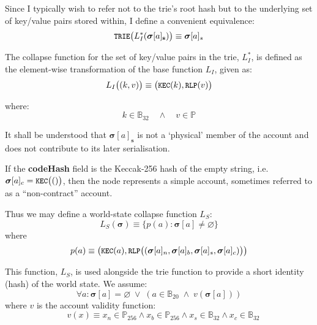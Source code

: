 \documentclass[9pt,oneside]{amsart}
\begin{document}
\begin{multicols}{2}
Since I typically wish to refer not to the trie's root hash but to the underlying set of key/value pairs stored within, I define a convenient equivalence:
\begin{equation}
\texttt{\small TRIE}\big(L_I^*(\boldsymbol{\sigma}[a]_\mathbf{s})\big) \equiv \boldsymbol{\sigma}[a]_s
\end{equation}

The collapse function for the set of key/value pairs in the trie, $L_I^*$, is defined as the element-wise transformation of the base function $L_I$, given as:
\begin{equation}
L_I\big( (k, v) \big) \equiv \big(\texttt{\small KEC}(k), \texttt{\small RLP}(v)\big)
\end{equation}

where:
\begin{equation}
k \in \mathbb{B}_{32} \quad \wedge \quad v \in \mathbb{P}
\end{equation}

It shall be understood that $\boldsymbol{\sigma}[a]_\mathbf{s}$ is not a `physical' member of the account and does not contribute to its later serialisation.

If the \textbf{codeHash} field is the Keccak-256 hash of the empty string, i.e. $\boldsymbol{\sigma}[a]_c = \texttt{\small KEC}\big(()\big)$, then the node represents a simple account, sometimes referred to as a ``non-contract'' account.

Thus we may define a world-state collapse function $L_S$:
\begin{equation}
L_S(\boldsymbol{\sigma}) \equiv \{ p(a): \boldsymbol{\sigma}[a] \neq \varnothing \}
\end{equation}
where
\begin{equation}
p(a) \equiv  \big(\texttt{\small KEC}(a), \texttt{\small RLP}\big( (\boldsymbol{\sigma}[a]_n, \boldsymbol{\sigma}[a]_b, \boldsymbol{\sigma}[a]_s, \boldsymbol{\sigma}[a]_c) \big) \big)
\end{equation}

This function, $L_S$, is used alongside the trie function to provide a short identity (hash) of the world state. We assume:
\begin{equation}
\forall a: \boldsymbol{\sigma}[a] = \varnothing \; \vee \; (a \in \mathbb{B}_{20} \; \wedge \; v(\boldsymbol{\sigma}[a]))
\end{equation}
where $v$ is the account validity function:
\begin{equation}
\quad v(x) \equiv x_n \in \mathbb{P}_{256} \wedge x_b \in \mathbb{P}_{256} \wedge x_s \in \mathbb{B}_{32} \wedge x_c \in \mathbb{B}_{32}
\end{equation}


\end{multicols}
\end{document}
